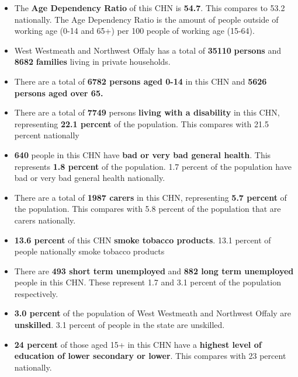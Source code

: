 \documentclass{article}
\begin{document}
\begin{itemize}

\item The \textbf{Age Dependency Ratio} of this CHN is  \textbf{54.7}. This compares to 53.2 nationally. The Age Dependency Ratio is the amount of people outside of working age (0-14 and 65+) per 100 people of working age (15-64). 

\item West Westmeath and Northwest Offaly has a total of \textbf{\num{35110}} \textbf{persons} and  \textbf{\num{8682}} \textbf{families} living in private households.

\item There are a total of \textbf{\num{6782} persons aged 0-14} in this CHN and \textbf{\num{5626} persons aged over 65.} 

\item There are a total of \textbf{\num{7749}} persons \textbf{living with a disability} in this CHN, representing \textbf{22.1 percent} of the population. This compares with  21.5 percent nationally

\item \textbf{\num{640}} people in this CHN have \textbf{bad or very bad general health}. This represents \textbf{1.8 percent} of the population. 1.7 percent of the population have bad or very bad general health nationally. 

\item There are a total of \textbf{\num{1987} carers} in this CHN, representing \textbf{5.7 percent} of the population. This compares with 5.8 percent of the population that are carers nationally. 

\item \textbf{13.6 percent} of this CHN \textbf{smoke tobacco products}. 13.1 percent of people nationally smoke tobacco products

\item There are \textbf{\num{493} short term unemployed} and \textbf{\num{882} long term unemployed} people in this CHN. These represent 1.7 and 3.1 percent of the population respectively.

\item  \textbf{3.0 percent} of the population of West Westmeath and Northwest Offaly are \textbf{unskilled}. 3.1 percent of people in the state are unskilled.

\item \textbf{24 percent} of those aged 15+ in this CHN have a \textbf{highest level of education of lower secondary or lower}. This compares with 23 percent nationally. 


\end{itemize}
\end{document}
